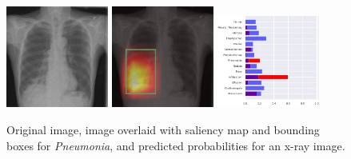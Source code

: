 \documentclass[12pt,oneside,a4paper]{report}
\begin{document}
\begin{figure}[H]
  \centering
  \includegraphics[width=0.3\textwidth]{images/preds/pneumonia}\hspace{0.01\textwidth}%
  \includegraphics[width=0.3\textwidth]{images/preds/pneumonia_cam}\hspace{0.01\textwidth}%
  \includegraphics[width=0.3\textwidth]{images/preds/pneumonia_probs}\\[0.01\textwidth]
  \caption{Original image, image overlaid with saliency map and bounding boxes
    for \emph{Pneumonia}, and predicted probabilities for an x-ray image.}
  \label{examples_7}
\end{figure}
\end{document}
